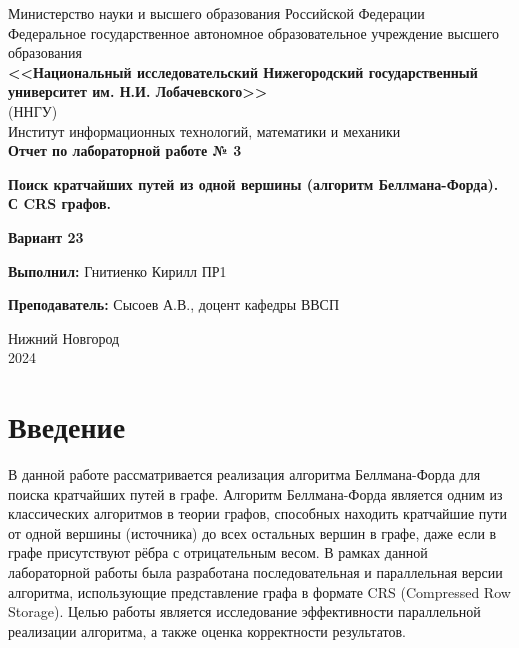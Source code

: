 \documentclass[12pt]{article}
\title{}
\author{}
\date{}
\begin{document}
\begin{titlepage}
\centering
    \large
    Министерство науки и высшего образования Российской Федерации\\[0.5cm]
    Федеральное государственное автономное образовательное учреждение высшего образования\\[0.5cm]
    \textbf{<<Национальный исследовательский Нижегородский государственный университет им. Н.И. Лобачевского>>}\\
    (ННГУ)\\[1cm]
    Институт информационных технологий, математики и механики\\
\vspace*{\fill}
{\Huge \textbf{Отчет по лабораторной работе № 3}}

\vspace{0.5cm}
{\Huge \textbf{Поиск кратчайших путей из одной вершины (алгоритм Беллмана-Форда). С CRS графов.}}

\vspace{0.5cm}
{\Huge \textbf{Вариант 23}}

\vspace{1.5cm}
{\Large \textbf{Выполнил:} Гнитиенко Кирилл ПР1} 

\vspace{0.5cm}
{\Large \textbf{Преподаватель:} Сысоев А.В., доцент кафедры ВВСП} 

\vspace*{\fill}

{\large Нижний Новгород\\ 2024}
\end{titlepage}

\newpage
\section*{Введение}

В данной работе рассматривается реализация алгоритма Беллмана-Форда для поиска кратчайших путей в графе. Алгоритм Беллмана-Форда является одним из классических алгоритмов в теории графов, способных находить кратчайшие пути от одной вершины (источника) до всех остальных вершин в графе, даже если в графе присутствуют рёбра с отрицательным весом. В рамках данной лабораторной работы была разработана последовательная и параллельная версии алгоритма, использующие представление графа в формате CRS (Compressed Row Storage). Целью работы является исследование эффективности параллельной реализации алгоритма, а также оценка корректности результатов.
\end{document}
